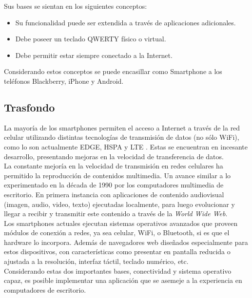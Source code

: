 Sus bases se sientan en los siguientes conceptos:
\begin{itemize}
\item Su funcionalidad puede ser extendida a través de aplicaciones adicionales.
\item Debe poseer un teclado QWERTY físico o virtual.
\item Debe permitir estar siempre conectado a la Internet.
\end{itemize}
Considerando estos conceptos se puede encasillar como Smartphone a los teléfonos Blackberry, iPhone y Android.

\subsection{Trasfondo}
La mayoría de los smartphones permiten el acceso a Internet a través de la red celular utilizando distintas tecnologías de transmisión de datos (no sólo WiFi), como lo son actualmente EDGE, HSPA y LTE \cite{cap1:tecnologias-celulares}. Estas se encuentran en incesante desarrollo, presentando mejoras en la velocidad de transferencia de datos.\\

La constante mejoría en la velocidad de transmisión en redes celulares ha permitido la reproducción de contenidos multimedia. Un avance similar a lo experimentado en la década de 1990 por los computadores multimedia de escritorio. En primera instancia con aplicaciones de contenido audiovisual (imagen, audio, video, texto) ejecutadas localmente, para luego evolucionar y llegar a recibir y transmitir este contenido a través de la \textit{World Wide Web}.\\

Los smartphones actuales ejecutan sistemas operativos avanzados que proveen módulos de conexión  a redes, ya sea celular, WiFi, o Bluetooth, si es que el hardware lo incorpora. Además de navegadores web diseñados especialmente para estos dispositivos, con características como presentar en pantalla reducida o ajustada a la resolución, interfaz táctil, teclado numérico, etc.\\

Considerando estas dos importantes bases, conectividad y sistema operativo capaz, es posible implementar una aplicación que se asemeje a la experiencia en computadores de escritorio.\\


